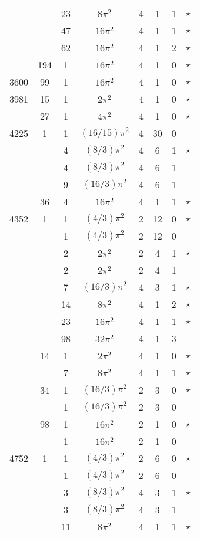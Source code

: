 \begin{tabular}{ccc|ccccc}
 &  & 23 & $8\pi^2$ & 4 & 1 & 1 & $\star$ \\
 &  & 47 & $16\pi^2$ & 4 & 1 & 1 & $\star$ \\
 &  & 62 & $16\pi^2$ & 4 & 1 & 2 & $\star$ \\
 & 194 & 1 & $16\pi^2$ & 4 & 1 & 0 & $\star$ \\
3600 & 99 & 1 & $16\pi^2$ & 4 & 1 & 0 & $\star$ \\
3981 & 15 & 1 & $2\pi^2$ & 4 & 1 & 0 & $\star$ \\
 & 27 & 1 & $4\pi^2$ & 4 & 1 & 0 & $\star$ \\
4225 & 1 & 1 & $(16/15)\pi^2$ & 4 & 30 & 0 &  \\
 &  & 4 & $(8/3)\pi^2$ & 4 & 6 & 1 & $\star$ \\
 &  & 4 & $(8/3)\pi^2$ & 4 & 6 & 1 &  \\
 &  & 9 & $(16/3)\pi^2$ & 4 & 6 & 1 &  \\
 & 36 & 4 & $16\pi^2$ & 4 & 1 & 1 & $\star$ \\
4352 & 1 & 1 & $(4/3)\pi^2$ & 2 & 12 & 0 & $\star$ \\
 &  & 1 & $(4/3)\pi^2$ & 2 & 12 & 0 &  \\
 &  & 2 & $2\pi^2$ & 2 & 4 & 1 & $\star$ \\
 &  & 2 & $2\pi^2$ & 2 & 4 & 1 &  \\
 &  & 7 & $(16/3)\pi^2$ & 4 & 3 & 1 & $\star$ \\
 &  & 14 & $8\pi^2$ & 4 & 1 & 2 & $\star$ \\
 &  & 23 & $16\pi^2$ & 4 & 1 & 1 & $\star$ \\
 &  & 98 & $32\pi^2$ & 4 & 1 & 3 &  \\
 & 14 & 1 & $2\pi^2$ & 4 & 1 & 0 & $\star$ \\
 &  & 7 & $8\pi^2$ & 4 & 1 & 1 & $\star$ \\
 & 34 & 1 & $(16/3)\pi^2$ & 2 & 3 & 0 & $\star$ \\
 &  & 1 & $(16/3)\pi^2$ & 2 & 3 & 0 &  \\
 & 98 & 1 & $16\pi^2$ & 2 & 1 & 0 & $\star$ \\
 &  & 1 & $16\pi^2$ & 2 & 1 & 0 &  \\
4752 & 1 & 1 & $(4/3)\pi^2$ & 2 & 6 & 0 & $\star$ \\
 &  & 1 & $(4/3)\pi^2$ & 2 & 6 & 0 &  \\
 &  & 3 & $(8/3)\pi^2$ & 4 & 3 & 1 & $\star$ \\
 &  & 3 & $(8/3)\pi^2$ & 4 & 3 & 1 &  \\
 &  & 11 & $8\pi^2$ & 4 & 1 & 1 & $\star$ \\

\end{tabular}
